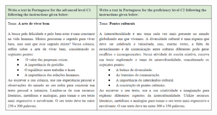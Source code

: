 \documentclass[portuguese]{textolivre}
\begin{document}
\begin{figure}[h!]
    \centering
    \includegraphics[width=0.8\linewidth]{Fig24.png}
    \label{fig24}
\end{figure}
\end{document}
